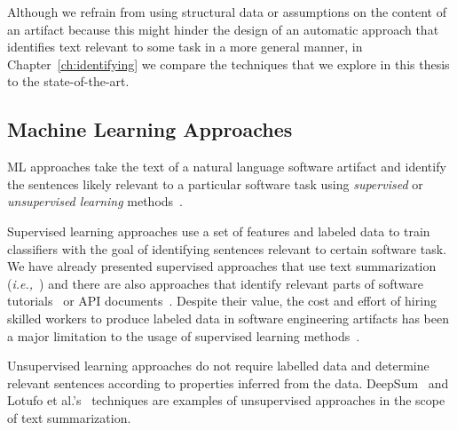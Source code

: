 Although we refrain from using structural data 
or assumptions on the content of an artifact 
because this might hinder the design of 
an automatic approach that identifies text relevant to some 
task in a more general manner, in 
Chapter~\ref{ch:identifying} 
we compare
 the techniques that we explore in this thesis
 to  the state-of-the-art.



\subsection{Machine Learning Approaches}
\label{cp2:machine-learning}


\acf{ML} approaches take the text of a natural language software artifact and identify 
the sentences likely relevant to a particular software task using \textit{supervised} or 
\textit{unsupervised learning} methods~\cite{zhang2005machine}.



Supervised learning approaches use a set of features and labeled data
 to train classifiers with the goal of identifying sentences relevant to 
 certain software task.
We have already presented supervised approaches that use text summarization (\textit{i.e.,}~\cite{Rastkar2010})
and there are also approaches that identify relevant 
parts of software tutorials~\cite{Jiang2016b}
or API documents~\cite{fucci2019, Maalej2013}.
Despite their value, 
the cost and effort of hiring skilled workers to produce 
labeled data in software engineering artifacts 
has been a major limitation 
to the usage of supervised learning 
methods~\cite{Arpteg2018}.





Unsupervised learning approaches do not require labelled data and determine 
relevant sentences according to properties inferred from the data. 
DeepSum~\cite{Li2018} and Lotufo et al.'s~\cite{Lotufo2012} techniques are examples of 
unsupervised approaches in the scope of text summarization. 



